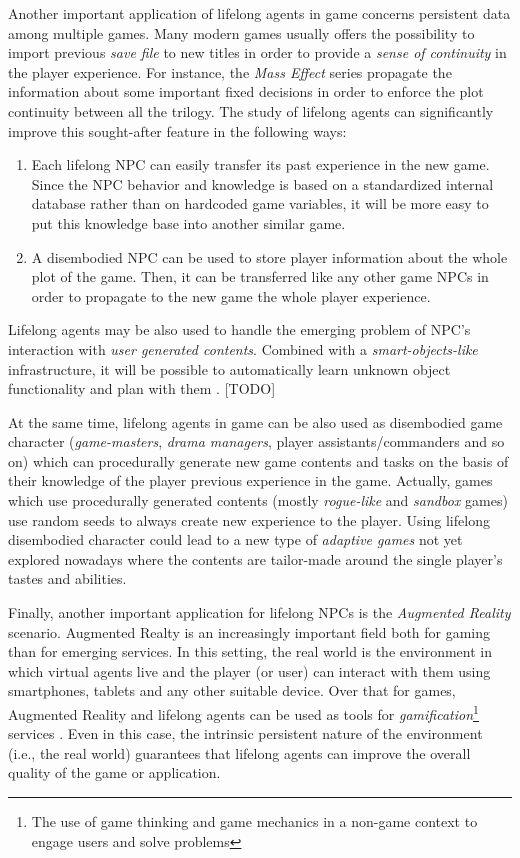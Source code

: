 Another important application of lifelong agents in game concerns persistent data among multiple games. Many modern games usually offers the possibility to import previous \emph{save file} to new titles in order to provide a \emph{sense of continuity} in the player experience. For instance, the \emph{Mass Effect} series propagate the information about some important fixed decisions in order to enforce the plot continuity between all the trilogy. The study of lifelong agents can significantly improve this sought-after feature in the following ways:

\begin{enumerate}
\item Each lifelong NPC can easily transfer its past experience in the new game. Since the NPC behavior and knowledge is based on a standardized internal database rather than on hardcoded game variables, it will be more easy to put this knowledge base into another similar game.
%
\item A disembodied NPC can be used to store player information about the whole plot of the game. Then, it can be transferred like any other game NPCs in order to propagate to the new game the whole player experience.
\end{enumerate}

Lifelong agents may be also used to handle the emerging problem of NPC's interaction with \emph{user generated contents}. Combined with a \emph{smart-objects-like} infrastructure, it will be possible to automatically learn unknown object functionality and plan with them \cite{abaci2005planning}. [TODO]

At the same time, lifelong agents in game can be also used as disembodied game character (\emph{game-masters}, \emph{drama managers}, player assistants/commanders and so on) which can procedurally generate new game contents and tasks on the basis of their knowledge of the player previous experience in the game. Actually, games which use procedurally generated contents (mostly \emph{rogue-like} and \emph{sandbox} games) use random seeds to always create new experience to the player. Using lifelong disembodied character could lead to a new type of \emph{adaptive games} not yet explored nowadays where the contents are tailor-made around the single player's tastes and abilities.

Finally, another important application for lifelong NPCs is the \emph{Augmented Reality} scenario. Augmented Realty is an increasingly important field both for gaming than for emerging services. In this setting, the real world is the environment in which virtual agents live and the player (or user) can interact with them using smartphones, tablets and any other suitable device. Over that for games, Augmented Reality and lifelong agents can be used as tools for \emph{gamification}\footnote{The use of game thinking and game mechanics in a non-game context to engage users and solve problems} services \cite{huotari2012defining}. Even in this case, the intrinsic persistent nature of the environment (i.e., the real world) guarantees that lifelong agents can improve the overall quality of the game or application.

